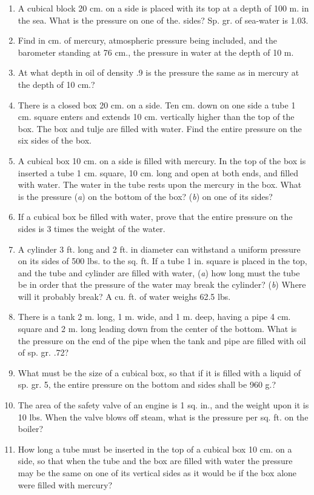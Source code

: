 \documentclass[11pt]{article}
\begin{document}
\begin{enumerate}
\item A cubical block 20 cm. on a side is placed with its top at a depth of 100 m. in the sea. What is the pressure on one of the. sides? Sp. gr. of sea-water is 1.03.
\item Find in cm. of mercury, atmospheric pressure being included, and the barometer standing at 76 cm., the pressure in water at the depth of 10 m.
\item At what depth in oil of density .9 is the pressure the same as in mercury at the depth of 10 cm.?
\item There is a closed box 20 cm. on a side. Ten cm. down on one side a tube 1 cm. square enters and extends 10 cm. vertically higher than the top of the box. The box and tulje are filled with water. Find the entire pressure on the six sides of the box.
\item A cubical box 10 cm. on a side is filled with mercury. In the top of the box is inserted a tube 1 cm. square, 10 cm. long and open at both ends, and filled with water. The water in the tube rests upon the mercury in the box. What is the pressure (\emph{a}) on the bottom of the box? (\emph{b}) on one of its sides?
\item If a cubical box be filled with water, prove that the entire pressure on the sides is 3 times the weight of the water.
\item A cylinder 3 ft. long and 2 ft. in diameter can withstand a uniform pressure on its sides of 500 lbs. to the sq. ft. If a tube 1 in. square is placed in the top, and the tube and cylinder are filled with water, (\emph{a}) how long must the tube be in order that the pressure of the water may break the cylinder? (\emph{b}) Where will it probably break? A cu. ft. of water weighs 62.5 lbs.
\item There is a tank 2 m. long, 1 m. wide, and 1 m. deep, having a pipe 4 cm. square and 2 m. long leading down from the center of the bottom. What is the pressure on the end of the pipe when the tank and pipe are filled with oil of sp. gr. .72?
\item What must be the size of a cubical box, so that if it is filled with a liquid of sp. gr. 5, the entire pressure on the bottom and sides shall be 960 g.?
\item The area of the safety valve of an engine is 1 sq. in., and the weight upon it is 10 lbs. When the valve blows off steam, what is the pressure per sq. ft. on the boiler?
\item How long a tube must be inserted in the top of a cubical box 10 cm. on a side, so that when the tube and the box are filled with water the pressure may be the same on one of its vertical sides as it would be if the box alone were filled with mercury?

\end{enumerate}
\end{document}
